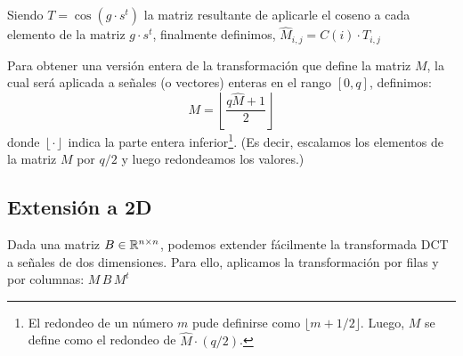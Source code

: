 Siendo $T=\cos(g\cdot s^t)$ la matriz resultante de aplicarle el coseno a cada elemento de la matriz $g\cdot s^t$,
finalmente definimos, $\widehat{M}_{i,j} = C(i) \cdot T_{i,j}$

Para obtener una versi\'on entera de la transformaci\'on que define la matriz $M$, la cual ser\'a aplicada a se\~nales (o vectores) enteras en el rango $[0,q]$, definimos:
\begin{equation}
M = \left\lfloor \frac{q \widehat{M} + 1}{2}  \right\rfloor \label{eq:dctint}
\end{equation} 
donde $\left\lfloor\cdot\right\rfloor$ indica la parte entera inferior\footnote{El redondeo de un n\'umero $m$ pude definirse como $\lfloor m + 1/2 \rfloor$. Luego, $M$ se define como el redondeo de $\widehat{M}\cdot(q/2)$.}. (Es decir, escalamos los elementos de la matriz $M$ por $q/2$ y luego redondeamos los valores.)

\subsection{Extensi\'on a 2D}\label{sec:dct2d}
Dada una matriz $B\in\mathbb{R}^{n\times n}$, podemos extender f\'acilmente la transformada DCT a se\~nales de dos dimensiones. Para ello, aplicamos la transformaci\'on por filas y por columnas: $ M\, B\, M^t $

